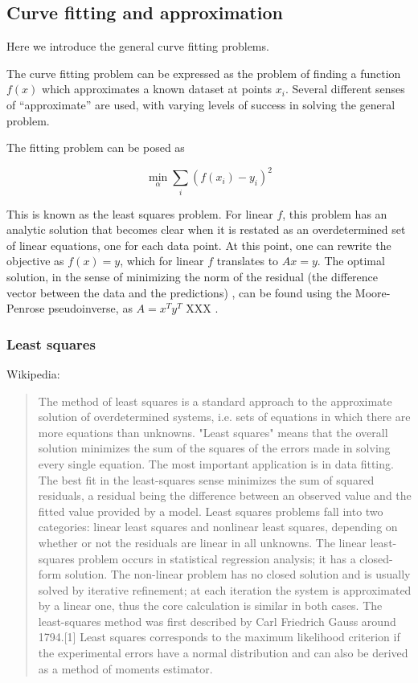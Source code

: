 \subsection{Curve fitting and approximation}
Here we introduce the general curve fitting problems.

The curve fitting problem can be expressed as the problem of finding a
function $f(x)$ which approximates a known dataset at points $x_i$.
Several different senses of ``approximate'' are used, with varying
levels of success in solving the general problem.

The fitting problem can be posed as 

\begin{equation}
  \label{eq:1}
  \min_{\alpha} \sum_i (f(x_i) - y_i)^2
\end{equation}

This is known as the least squares problem.  For linear $f$, this
problem has an analytic solution that becomes clear when it is
restated as an overdetermined set of linear equations, one for each
data point.  At this point, one can rewrite the objective as $f(x) =
y$, which for linear $f$ translates to $Ax=y$.  The optimal solution,
in the sense of minimizing the norm of the residual (the difference
vector between the data and the predictions) , can be found using the
Moore-Penrose pseudoinverse, as $A = x^Ty^T$ XXX .


\subsubsection{Least squares}
Wikipedia: 
\begin{quote}
  The method of least squares is a standard approach to the
  approximate solution of overdetermined systems, i.e. sets of
  equations in which there are more equations than unknowns. "Least
  squares" means that the overall solution minimizes the sum of the
  squares of the errors made in solving every single equation.  The
  most important application is in data fitting. The best fit in the
  least-squares sense minimizes the sum of squared residuals, a
  residual being the difference between an observed value and the
  fitted value provided by a model.  Least squares problems fall into
  two categories: linear least squares and nonlinear least squares,
  depending on whether or not the residuals are linear in all
  unknowns. The linear least-squares problem occurs in statistical
  regression analysis; it has a closed-form solution. The non-linear
  problem has no closed solution and is usually solved by iterative
  refinement; at each iteration the system is approximated by a linear
  one, thus the core calculation is similar in both cases.  The
  least-squares method was first described by Carl Friedrich Gauss
  around 1794.[1] Least squares corresponds to the maximum likelihood
  criterion if the experimental errors have a normal distribution and
  can also be derived as a method of moments estimator.
\end{quote}

